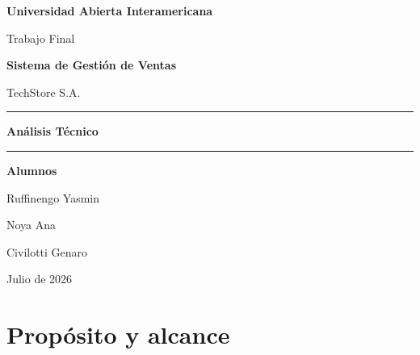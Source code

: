 \documentclass[12pt,a4paper]{article}
\begin{document}
\begin{titlepage}
    \centering

    \vspace*{1.5cm}

    {\Large\bfseries\color{uaiBlue}
    Universidad Abierta Interamericana\par}

    \vspace{2.2cm}

    {\large Trabajo Final\par}
    \vspace{0.4cm}
    {\Huge\bfseries Sistema de Gestión de Ventas\par}
    \vspace{0.6cm}
    {\LARGE TechStore S.A.\par}

    \vspace{1.8cm}

    \rule{0.75\textwidth}{1.2pt}
    \vspace{0.5cm}

    {\LARGE\bfseries\color{techBlue} Análisis Técnico\par}

    \vspace{0.5cm}
    \rule{0.75\textwidth}{1.2pt}

    \vfill

    {\large\bfseries Alumnos\par}
    \vspace{0.5cm}

    {\large
    Ruffinengo Yasmin\par
    Noya Ana\par
    Civilotti Genaro\par}

    \vfill

    {\large Julio de 2026\par}

    \vspace{1cm}
\end{titlepage}

\tableofcontents
\newpage

\section{Propósito y alcance}
\end{document}
